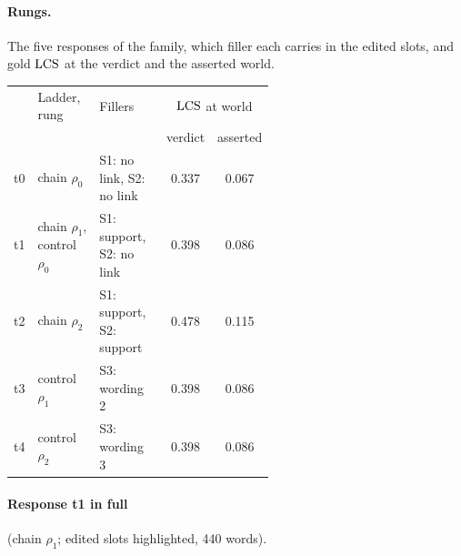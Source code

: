 \paragraph{Rungs.} The five responses of the family, which filler each carries in the edited slots, and gold $\mathrm{LCS}$ at the verdict and the asserted world.

\begin{center}\scriptsize
\setlength{\tabcolsep}{2.5pt}
\begin{tabular}{@{}l>{\raggedright\arraybackslash}p{0.27\linewidth}>{\raggedright\arraybackslash}p{0.30\linewidth}cc@{}}
\toprule
& Ladder, rung & Fillers & \multicolumn{2}{c}{$\mathrm{LCS}$ at world} \\
& & & verdict & asserted \\
\midrule
t0 & chain $\rho_0$ & S1: no link, S2: no link & 0.337 & 0.067 \\
t1 & chain $\rho_1$, control $\rho_0$ & S1: support, S2: no link & 0.398 & 0.086 \\
t2 & chain $\rho_2$ & S1: support, S2: support & 0.478 & 0.115 \\
t3 & control $\rho_1$ & S3: wording 2 & 0.398 & 0.086 \\
t4 & control $\rho_2$ & S3: wording 3 & 0.398 & 0.086 \\
\bottomrule
\end{tabular}
\end{center}

\paragraph{Response t1 in full} (chain $\rho_1$; edited slots highlighted, 440 words).

